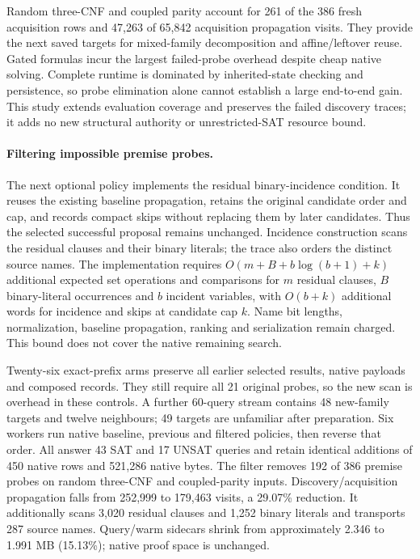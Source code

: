 \documentclass[11pt,a4paper]{article}
\numberwithin{equation}{section}
\theoremstyle{plain}
\theoremstyle{definition}
\theoremstyle{remark}
\begin{document}
Random three-CNF and coupled parity account for 261 of the 386 fresh acquisition
rows and 47,263 of 65,842 acquisition propagation visits. They provide the next
saved targets for mixed-family decomposition and affine/leftover reuse. Gated
formulas incur the largest failed-probe overhead despite cheap native solving.
Complete runtime is dominated by inherited-state checking and persistence, so
probe elimination alone cannot establish a large end-to-end gain. This study
extends evaluation coverage and preserves the failed discovery traces; it adds
no new structural authority or unrestricted-SAT resource bound.

\paragraph{Filtering impossible premise probes.}
The next optional policy implements the residual binary-incidence condition.
It reuses the existing baseline propagation, retains the original candidate
order and cap, and records compact skips without replacing them by later
candidates. Thus the selected successful proposal remains unchanged. Incidence
construction scans the residual clauses and their binary literals; the trace
also orders the distinct source names. The implementation requires
$O(m+B+b\log(b+1)+k)$ additional expected set operations and comparisons for
$m$ residual clauses, $B$ binary-literal occurrences and $b$ incident variables,
with $O(b+k)$ additional words for incidence and skips at candidate cap $k$.
Name bit lengths, normalization, baseline propagation, ranking and serialization
remain charged. This bound does not cover the native remaining search.

Twenty-six exact-prefix arms preserve all earlier selected results, native
payloads and composed records. They still require all 21 original probes, so
the new scan is overhead in these controls. A further 60-query stream contains
48 new-family targets and twelve neighbours; 49 targets are unfamiliar after
preparation. Six workers run native baseline, previous and filtered policies,
then reverse that order. All answer 43 SAT and 17 UNSAT queries and retain
identical additions of 450 native rows and 521,286 native bytes. The filter
removes 192 of 386 premise probes on random three-CNF and coupled-parity inputs.
Discovery/acquisition propagation falls from 252,999 to 179,463 visits, a
29.07\% reduction. It additionally scans 3,020 residual clauses and 1,252 binary
literals and transports 287 source names. Query/warm sidecars shrink from
approximately 2.346 to 1.991 MB (15.13\%); native proof space is unchanged.
\end{document}
